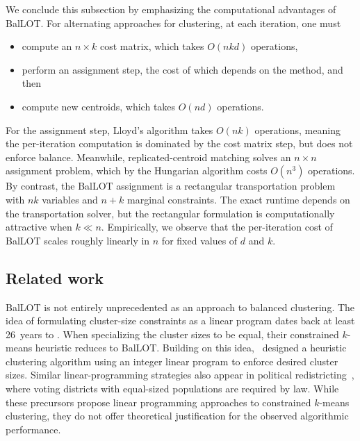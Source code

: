 \documentclass{article}
\theoremstyle{plain}
\theoremstyle{definition}
\newcommand{\1}{\mathbf{1}}
\begin{document}
We conclude this subsection by emphasizing the computational advantages of BalLOT.
For alternating approaches for clustering, at each iteration, one must
\begin{itemize}
\item[1.]
compute an $n\times k$ cost matrix, which takes $O(nkd)$ operations,
\item[2.]
perform an assignment step, the cost of which depends on the method, and then
\item[3.]
compute new centroids, which takes $O(nd)$ operations.
\end{itemize}
For the assignment step, Lloyd's algorithm takes $O(nk)$ operations, meaning the per-iteration computation is dominated by the cost matrix step, but does not enforce balance.
Meanwhile, replicated-centroid matching solves an $n\times n$ assignment problem, which by the Hungarian algorithm costs $O(n^3)$ operations.
By contrast, the BalLOT assignment is a rectangular transportation problem with $nk$ variables and $n+k$ marginal constraints.
The exact runtime depends on the transportation solver, but the rectangular formulation is computationally attractive when $k\ll n$.
Empirically, we observe that the per-iteration cost of BalLOT scales roughly linearly in $n$ for fixed values of $d$ and $k$.



\subsection{Related work}

BalLOT is not entirely unprecedented as an approach to balanced clustering.
The idea of formulating cluster-size constraints as a linear program dates back at least 26~years to \cite{Ng2000ConstrainedKMeans,bradley2000constrained}.
When specializing the cluster sizes to be equal, their constrained $k$-means heuristic reduces to BalLOT.
Building on this idea, \cite{ZHU2010883}~designed a heuristic clustering algorithm using an integer linear program to enforce desired cluster sizes.
Similar linear-programming strategies also appear in political redistricting~\cite{CohenAddad2017Balanced}, where voting districts with equal-sized populations are required by law.
While these precursors propose linear programming approaches to constrained $k$-means clustering, they do not offer theoretical justification for the observed algorithmic performance.
\end{document}
